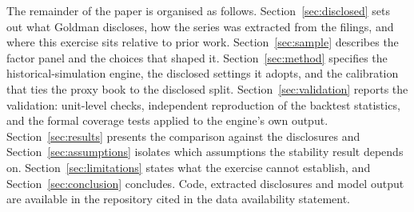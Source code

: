 The remainder of the paper is organised as follows. Section~\ref{sec:disclosed}
sets out what Goldman discloses, how the series was extracted from the filings,
and where this exercise sits relative to prior work.
Section~\ref{sec:sample} describes the factor panel and the choices that shaped
it. Section~\ref{sec:method} specifies the historical-simulation engine, the
disclosed settings it adopts, and the calibration that ties the proxy book to
the disclosed split. Section~\ref{sec:validation} reports the validation:
unit-level checks, independent reproduction of the backtest statistics, and the
formal coverage tests applied to the engine's own output.
Section~\ref{sec:results} presents the comparison against the disclosures and
Section~\ref{sec:assumptions} isolates which assumptions the stability result
depends on. Section~\ref{sec:limitations} states what the exercise cannot
establish, and Section~\ref{sec:conclusion} concludes. Code, extracted
disclosures and model output are available in the repository cited in the data
availability statement.
